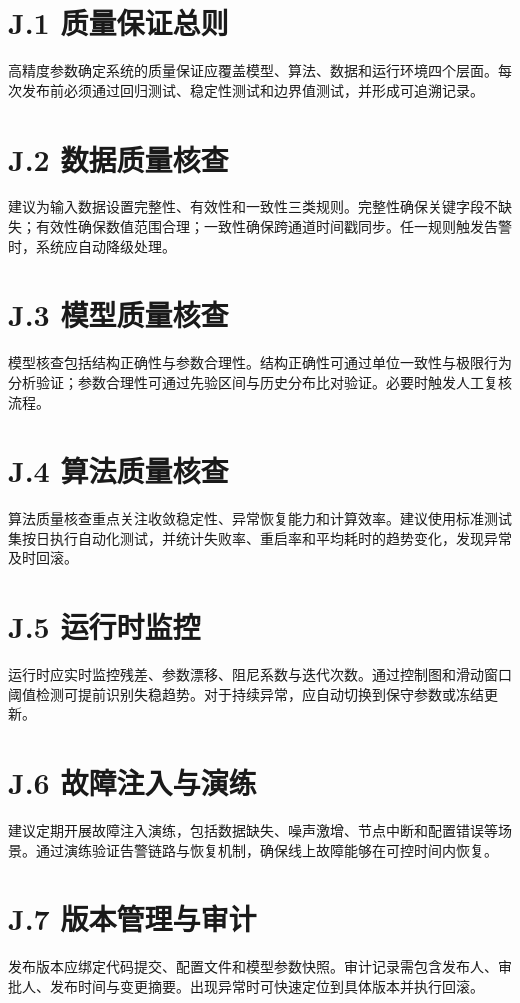 \section*{J.1 质量保证总则}
高精度参数确定系统的质量保证应覆盖模型、算法、数据和运行环境四个层面。每次发布前必须通过回归测试、稳定性测试和边界值测试，并形成可追溯记录。
\clearpage

\section*{J.2 数据质量核查}
建议为输入数据设置完整性、有效性和一致性三类规则。完整性确保关键字段不缺失；有效性确保数值范围合理；一致性确保跨通道时间戳同步。任一规则触发告警时，系统应自动降级处理。
\clearpage

\section*{J.3 模型质量核查}
模型核查包括结构正确性与参数合理性。结构正确性可通过单位一致性与极限行为分析验证；参数合理性可通过先验区间与历史分布比对验证。必要时触发人工复核流程。
\clearpage

\section*{J.4 算法质量核查}
算法质量核查重点关注收敛稳定性、异常恢复能力和计算效率。建议使用标准测试集按日执行自动化测试，并统计失败率、重启率和平均耗时的趋势变化，发现异常及时回滚。
\clearpage

\section*{J.5 运行时监控}
运行时应实时监控残差、参数漂移、阻尼系数与迭代次数。通过控制图和滑动窗口阈值检测可提前识别失稳趋势。对于持续异常，应自动切换到保守参数或冻结更新。
\clearpage

\section*{J.6 故障注入与演练}
建议定期开展故障注入演练，包括数据缺失、噪声激增、节点中断和配置错误等场景。通过演练验证告警链路与恢复机制，确保线上故障能够在可控时间内恢复。
\clearpage

\section*{J.7 版本管理与审计}
发布版本应绑定代码提交、配置文件和模型参数快照。审计记录需包含发布人、审批人、发布时间与变更摘要。出现异常时可快速定位到具体版本并执行回滚。
\clearpage

